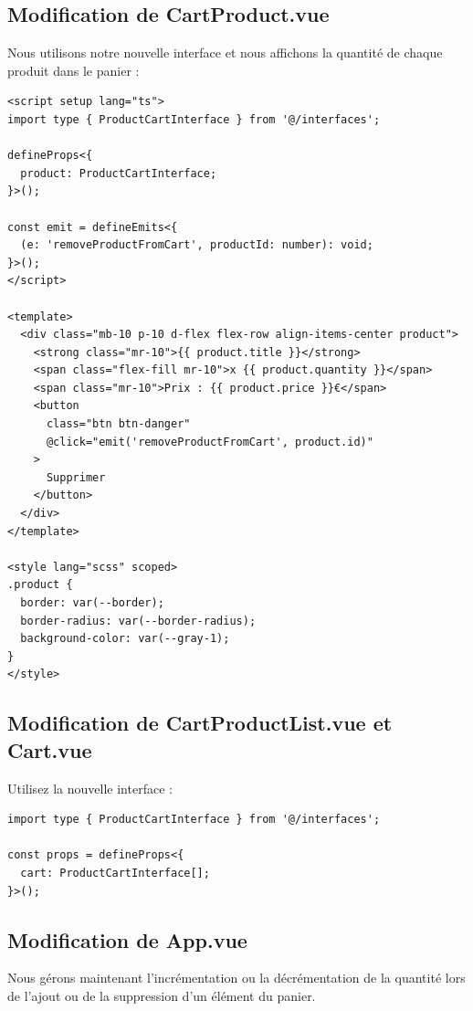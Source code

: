 \subsection{Modification de {\color{monOrange}CartProduct.vue}}
Nous utilisons notre nouvelle interface et nous affichons la quantité de chaque produit dans le panier :
\begin{verbatim}
<script setup lang="ts">
import type { ProductCartInterface } from '@/interfaces';

defineProps<{
  product: ProductCartInterface;
}>();

const emit = defineEmits<{
  (e: 'removeProductFromCart', productId: number): void;
}>();
</script>

<template>
  <div class="mb-10 p-10 d-flex flex-row align-items-center product">
    <strong class="mr-10">{{ product.title }}</strong>
    <span class="flex-fill mr-10">x {{ product.quantity }}</span>
    <span class="mr-10">Prix : {{ product.price }}€</span>
    <button
      class="btn btn-danger"
      @click="emit('removeProductFromCart', product.id)"
    >
      Supprimer
    </button>
  </div>
</template>

<style lang="scss" scoped>
.product {
  border: var(--border);
  border-radius: var(--border-radius);
  background-color: var(--gray-1);
}
</style>
\end{verbatim}
\subsection{Modification de {\color{monOrange}CartProductList.vue} et {\color{monOrange}Cart.vue}}
Utilisez la nouvelle interface :
\begin{verbatim}
import type { ProductCartInterface } from '@/interfaces';

const props = defineProps<{
  cart: ProductCartInterface[];
}>();
\end{verbatim}
\subsection{Modification de {\color{monOrange}App.vue}}
Nous gérons maintenant l'incrémentation ou la décrémentation de la quantité lors de l'ajout ou de la suppression d'un élément du panier.


